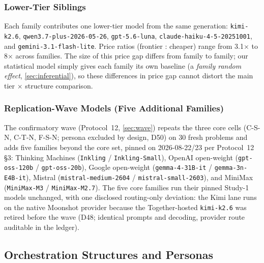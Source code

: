 \documentclass[12pt,a4paper]{article}
\begin{document}
\subsubsection{Lower-Tier Siblings}

\begin{sloppypar}
Each family contributes one lower-tier model from the same generation:
\texttt{kimi-k2.6}, \texttt{qwen3.7-plus-2026-05-26}, \texttt{gpt-5.6-luna},
\texttt{claude-haiku-4-5-20251001}, and \texttt{gemini-3.1-flash-lite}. Price
ratios (frontier : cheaper) range from 3.1$\times$ to 8$\times$ across families.
The size of this price gap differs from family to family; our statistical model
simply gives each family its own baseline (a \emph{family random effect},
\cref{sec:inferential}), so these differences in price gap cannot distort the
main tier $\times$ structure comparison.
\end{sloppypar}

\subsubsection{Replication-Wave Models (Five Additional Families)}

The confirmatory wave (Protocol~12, \cref{sec:wave}) repeats the three core
cells (C-S-N, C-T-N, F-S-N; persona excluded by design, D50) on 30 fresh
problems and adds five families beyond the core set, pinned on
2026-08-22/23 per Protocol~12 \S3: Thinking Machines
(\texttt{Inkling} / \texttt{Inkling-Small}), OpenAI open-weight
(\texttt{gpt-oss-120b} / \texttt{gpt-oss-20b}), Google open-weight
(\texttt{gemma-4-31B-it} / \texttt{gemma-3n-E4B-it}), Mistral
(\texttt{mistral-medium-2604} / \texttt{mistral-small-2603}), and MiniMax
(\texttt{MiniMax-M3} / \texttt{MiniMax-M2.7}). The five core families run their
pinned Study-1 models unchanged, with one disclosed routing-only deviation:
the Kimi lane runs on the native Moonshot provider because the Together-hosted
\texttt{kimi-k2.6} was retired before the wave (D48; identical prompts and
decoding, provider route auditable in the ledger).

\subsection{Orchestration Structures and Personas}
\end{document}
